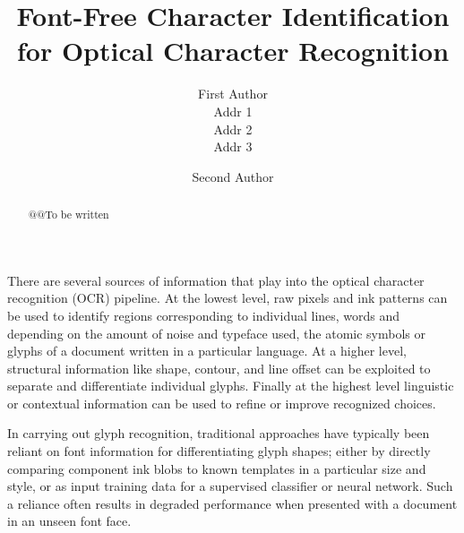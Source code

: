 \documentclass[times, 10pt,twocolumn]{article}
\begin{document}
\title{Font-Free Character Identification for Optical Character Recognition}

\author{First Author\\
Addr 1\\
Addr 2\\
Addr 3\\
\and
Second Author\\
}


\maketitle
\thispagestyle{empty}


\begin{abstract}
@@To be written
\end{abstract}




There are several sources of information that play into the optical character
recognition (OCR) pipeline.  At the lowest level, raw pixels and ink patterns
can be used to identify regions corresponding to individual lines, words and
depending on the amount of noise and typeface used, the atomic symbols or
glyphs of a document written in a particular language.  At a higher level, 
structural information like shape, contour, and line offset can be exploited 
to separate and differentiate individual glyphs.  Finally at the highest level 
linguistic or contextual information can be used to refine or improve 
recognized choices.

In carrying out glyph recognition, traditional approaches have typically
been reliant on font information for differentiating glyph shapes; either
by directly comparing component ink blobs to known templates in a particular
size and style, or as input training data for a supervised classifier
or neural network.  Such a reliance often results in degraded performance when 
presented with a document in an unseen font face.
\end{document}
